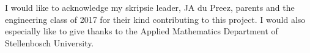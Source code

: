 

\begin{acknowledgements}      %


I would like to acknowledge my skripsie leader, JA du Preez, parents and the engineering class of 2017 for their kind contributing to this project. I would also especially like to give thanks to the Applied Mathematics Department of Stellenbosch University.
\end{acknowledgements}


